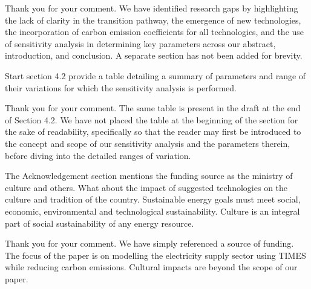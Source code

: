 \documentclass[answers,11pt]{exam}
\begin{document}
\begin{questions}
        \begin{solution}
        
                 Thank you for your comment. We have identified research gaps by highlighting the lack of clarity in the transition pathway, the emergence of new technologies, the incorporation of carbon emission coefficients for all technologies, and the use of sensitivity analysis in determining key parameters across our abstract, introduction, and conclusion. A separate section has not been added for brevity.
                 
                 
        \end{solution}     
        
                        \question   Start section 4.2 provide a table detailing a summary of parameters and range of their variations for which the sensitivity analysis is performed.
                                
        \begin{solution}
        
                 Thank you for your comment. The same table is present in the draft at the end of Section 4.2. We have not placed the table at the beginning of the section for the sake of readability, specifically so that the reader may first be introduced to the concept and scope of our sensitivity analysis and the parameters therein, before diving into the detailed ranges of variation.
                 
                 
        \end{solution} 
                        \question   The Acknowledgement section mentions the funding source as the ministry of culture and others. What about the impact of suggested technologies on the culture and tradition of the country. Sustainable energy goals must meet social, economic, environmental and technological sustainability. Culture is an integral part of social sustainability of any energy resource. 
                                
        \begin{solution}
        
                 Thank you for your comment. We have simply referenced a source of funding. The focus of the paper is on modelling the electricity supply sector using TIMES while reducing carbon emissions. Cultural impacts are beyond the scope of our paper.
                 

\end{solution}
\end{questions}
\end{document}
